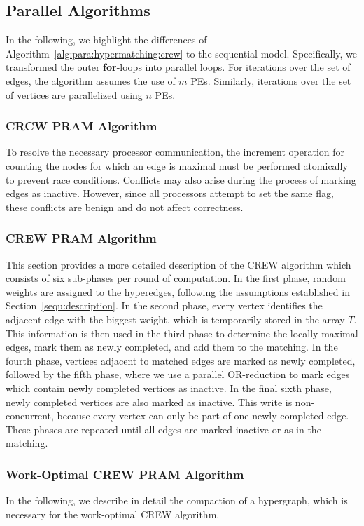 \documentclass[runningheads]{llncs}
\begin{document}
\subsection{Parallel Algorithms}
In the following, we highlight the differences of Algorithm~\ref{alg:para:hypermatching:crcw} to the sequential model.
Specifically, we  transformed the outer \textbf{for}-loops into parallel loops. For iterations over the set of edges, the algorithm assumes the use of $m$ PEs. 
Similarly, iterations over the set of vertices are parallelized using $n$ PEs. 

\subsubsection{CRCW PRAM Algorithm}
To resolve the necessary processor communication, the increment operation for counting the nodes for which an edge is maximal must be performed atomically to prevent race conditions. Conflicts may also arise during the process of marking edges as inactive. However, since all processors attempt to set the same flag, these conflicts are benign and do not affect correctness.

\subsubsection{CREW PRAM Algorithm}\label{sec:details:crew}
This section provides a more detailed description of the CREW algorithm which consists of six sub-phases per round of computation.
In the first phase, random weights are assigned to the hyperedges, following the assumptions established in Section~\ref{sequ:description}.
In the second phase, every vertex identifies the adjacent edge with the biggest weight, which is temporarily stored in the array $T$. This information is then used in the third phase to determine the locally maximal edges, mark them as newly completed, and add them to the matching. In the fourth phase, vertices adjacent to matched edges are marked as newly completed, followed by the fifth phase, where we use a parallel OR-reduction to mark edges which contain newly completed vertices as inactive. In the final sixth phase, newly completed vertices are also marked as inactive. This write is non-concurrent, because every vertex can only be part of one newly completed edge.
These phases are repeated until all edges are marked inactive or as in the matching.

\subsubsection{Work-Optimal CREW PRAM Algorithm}\label{sec:details:optimal}
In the following, we describe in detail the compaction of a hypergraph, which is necessary for the work-optimal CREW algorithm. %
\end{document}

